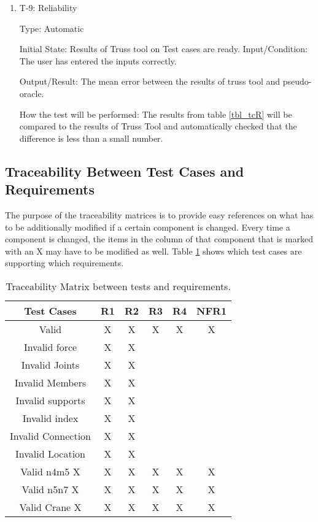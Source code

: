 \documentclass[12pt, titlepage]{article}
\begin{document}
\begin{enumerate}

\item{T-9: Reliability\\}

Type: Automatic
					
Initial State: Results of Truss tool on Test cases are ready.					
Input/Condition: The user has entered the inputs correctly.

					
Output/Result: The mean error between the results of truss tool and pseudo-oracle.
					
How the test will be performed: The results from table \ref{tbl_tcR}  will be compared to the results of Truss Tool and automatically checked that the difference is less than a small number.

	

\end{enumerate}

\subsection{Traceability Between Test Cases and Requirements}
The purpose of the traceability matrices is to provide easy references on what has to be additionally modified if a certain component is changed. Every time a component is changed, the items in the column of that component that is marked with an X may have to be modified as well. Table \ref{tbl_tr_TC} shows which test cases are supporting which requirements.


\begin{table} [h!]
\centering
\begin{tabular}{|c|c| c| c| c | c |}
\hline
Test Cases & R1 & R2 & R3& R4& NFR1  \\
 \hline   
 Valid & X&X & X&X &X  \\
 \hline
  Invalid force   & X& X& & &  \\
 \hline
  Invalid Joints   &X & X& & &  \\
 \hline
  Invalid Members &X &X & & &  \\
 \hline
 Invalid supports &X &X & & &  \\
 \hline
 Invalid index &X &X & & &  \\
 \hline
 Invalid Connection &X &X & & &  \\
 \hline
 Invalid Location &X &X & & &  \\
 \hline
  Valid n4m5  X&X &X &X &X &X  \\
 \hline
  Valid n5n7  X& X& X& X&X &X  \\
 \hline
  Valid Crane X & X& X& X& X& X \\
 \hline
 
\end{tabular}
\caption{\label{tbl_tr_TC}Traceability Matrix between tests and requirements.}
\end{table}
\end{document}
